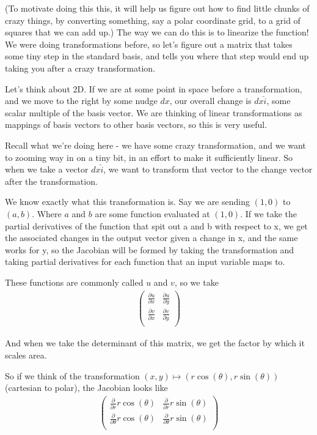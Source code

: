 \documentclass[12pt, letterpaper]{article}
\begin{document}
(To motivate doing this this, it will help us figure out how to find little chunks of crazy things, by converting something, say a polar coordinate grid, to a grid of squares that we can add up.)
The way we can do this is to linearize the function!
We were doing transformations before, so let's figure out a matrix that takes some tiny step in the standard basis, and tells you where that step would end up taking you after a crazy transformation.

Let's think about 2D.
If we are at some point in space before a transformation, and we move to the right by some nudge $dx$,
our overall change is $dx\hat{i}$, some scalar multiple of the basis vector.
We are thinking of linear transformations as mappings of basis vectors to other basis vectors, so this is very useful.

Recall what we're doing here - we have some crazy transformation, and we want to zooming way in on a tiny bit, in an effort to make it sufficiently linear.
So when we take a vector $dx\hat{i}$, we want to transform that vector to the change vector after the transformation.

We know exactly what this transformation is. 
Say we are sending $(1, 0)$ to $(a, b)$.
Where $a$ and $b$ are some function evaluated at $(1, 0)$.
If we take the partial derivatives of the function that spit out a and b with respect to x, we get the associated changes in the output vector given a change in x,
and the same works for y, so the Jacobian will be formed by taking the transformation and taking partial derivatives for each function that an input variable maps to.

These functions are commonly called $u$ and $v$, so we take
\begin{gather*}
    \begin{pmatrix}
        \frac{\partial u}{\partial x} & \frac{\partial u}{\partial y}\\
        \frac{\partial v}{\partial x} & \frac{\partial v}{\partial y}\\
    \end{pmatrix}
\end{gather*}

And when we take the determinant of this matrix, we get the factor by which it scales area.

So if we think of the transformation $(x, y) \mapsto (r\cos(\theta), r\sin(\theta))$ (cartesian to polar),
the Jacobian looks like
\begin{gather*}
    \begin{pmatrix}
        \frac{\partial}{\partial r} r\cos(\theta) & \frac{\partial}{\partial r} r\sin(\theta)\\
        \frac{\partial}{\partial \theta} r\cos(\theta) & \frac{\partial}{\partial \theta} r\sin(\theta)\\
    \end{pmatrix}
\end{gather*}
\end{document}

